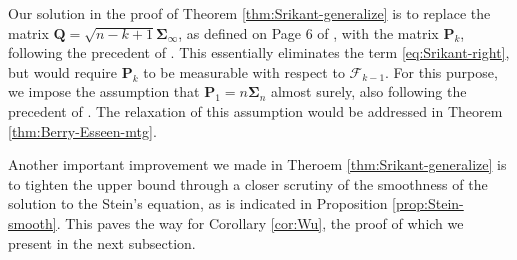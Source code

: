 Our solution in the proof of Theorem \ref{thm:Srikant-generalize} is to replace the matrix $\bm{Q}=\sqrt{n-k+1}\bm{\Sigma}_{\infty}$, as defined on Page 6 of \cite{srikant2024rates}, with the matrix $\bm{P}_k$, following the precedent of \cite{JMLR2019CLT}. This essentially eliminates the term \eqref{eq:Srikant-right}, but would require $\bm{P}_k$ to be measurable with respect to $\mathcal{F}_{k-1}$. For this purpose, we impose the assumption that $\bm{P}_1 = n\bm{\Sigma}_n$ almost surely, also following the precedent of \cite{JMLR2019CLT}. The relaxation of this assumption would be addressed in Theorem \ref{thm:Berry-Esseen-mtg}. 

Another important improvement we made in Theroem \ref{thm:Srikant-generalize} is to tighten the upper bound through a closer scrutiny of the smoothness of the solution to the Stein's equation, as is indicated in Proposition \ref{prop:Stein-smooth}. This paves the way for Corollary \ref{cor:Wu}, the proof of which we present in the next subsection. 
